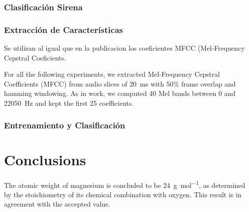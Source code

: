 \documentclass{article}
\begin{document}
\subsubsection{Clasificación Sirena}

\subsubsection*{Extracción de Características}
Se utilizan al igual que en la publicacion \cite{Salamon:UrbanSound:ACMMM:14} los coeficientes MFCC (Mel-Frequency Cepstral Coeficients. 

For all the following experiments, we extracted Mel-Frequency Cepstral Coefficients (MFCC) from audio slices of \SI{20}{\milli\second} with 50\% frame overlap and hamming windowing. As in  work, we computed 40 Mel bands between 0 and \SI{22050}{\Hz} and kept the first 25 coefficients. 

\subsubsection*{Entrenamiento y Clasificación}



\section{Conclusions}

The atomic weight of magnesium is concluded to be \SI{24}{\gram\per\mol}, as determined by the stoichiometry of its chemical combination with oxygen. This result is in agreement with the accepted value.






\end{document}
